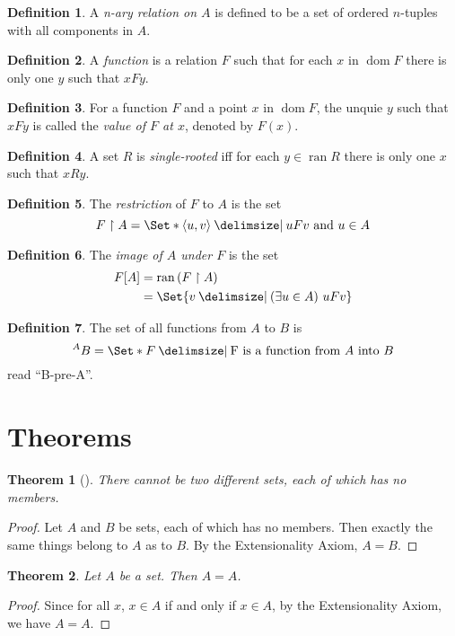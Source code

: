 \documentclass[12pt]{article}
\theoremstyle{plain}
\newtheorem{thm}{Theorem}[section]
\theoremstyle{remark}
\theoremstyle{definition}
\newtheorem{defn}{Definition}[section]
\theoremstyle{remark}
\newcommand{\thmproof}[3]{%
\begin{thm}[#1]
#2
\end{thm}
\begin{proof}
#3
\end{proof}
}
\providecommand\st{}
\newcommand\SetSymbol[1][]{%
\nonscript\:#1\vert%
\allowbreak%
\nonscript\:
\mathopen{}}
\DeclarePairedDelimiter{\ang}{\langle}{\rangle}
\renewcommand\st{\SetSymbol[\delimsize]}
\DeclareMathOperator{\dom}{dom}
\DeclareMathOperator{\ran}{ran}
\begin{document}
\begin{defn}
A \textit{n-ary relation on $A$} is defined to be a set of ordered $n$-tuples with all components in $A$.
\end{defn}

\begin{defn}
A \textit{function} is a relation $F$ such that for each $x$ in $\dom F$ there is only one $y$ such that $xFy$.
\end{defn}

\begin{defn}
For a function $F$ and a point $x$ in $\dom F$, the unquie $y$ such that $xFy$ is called the \textit{value of $F$ at $x$}, denoted by $F(x)$.
\end{defn}

\begin{defn}
A set $R$ is \textit{single-rooted} iff for each $y \in \ran R$ there is only one $x$ such that $xRy$.
\end{defn}

\begin{defn}
The \textit{restriction} of $F$ to $A$ is the set
\[
F \restriction A = \Set*{\ang{u,v} \st uFv \text{ and } u \in A}
\]
\end{defn}

\begin{defn}
The \textit{image of $A$ under $F$} is the set
\begin{align*}
F [A] &= \ran{(F \restriction A)}\\
&= \Set{v \st (\exists u \in A)\ uFv}
\end{align*}
\end{defn}

\begin{defn}
The set of all functions from $A$ to $B$ is
\[
^A B = \Set*{F \st \text{F is a function from $A$ into $B$}}
\]
read ``B-pre-A''.
\end{defn}

\section{Theorems}
\thmproof{}{There cannot be two different sets, each of which has no members.}
{Let $A$ and $B$ be sets, each of which has no members. Then exactly the same things belong to $A$ as to $B$. By the Extensionality Axiom, $A = B$.
}

\begin{thm}\label{identity}
Let $A$ be a set. Then $A = A$.
\end{thm}
\begin{proof}
Since for all $x$, $x \in A$ if and only if $x \in A$, by the Extensionality Axiom, we have $A = A$.
\end{proof}
\end{document}

